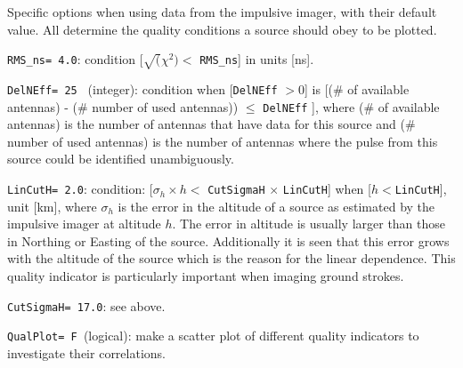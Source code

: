 Specific options when using data from the impulsive imager, with their default value. All determine the quality conditions a source should obey to be plotted. 
\begin{enumerate*}
\item \verb!RMS_ns= 4.0!: condition [$\sqrt(\chi^2) <$ \verb!RMS_ns!] in units [ns].
\item \verb!DelNEff= 25 ! (integer): condition when [\verb!DelNEff! $>0$] is [(\# of available antennas) - (\# number of used antennas)) $\leq$ \verb!DelNEff! ], where (\# of available antennas) is the number of antennas that have data for this source and (\# number of used antennas) is the number of antennas where the pulse from this source could be identified unambiguously.
\item \verb!LinCutH= 2.0!: condition: [$\sigma_h \times h <$ \verb!CutSigmaH! $\times$ \verb!LinCutH!] when [$h < $\verb!LinCutH!], unit [km], where $\sigma_h$ is the error in the altitude of a source as estimated by the impulsive imager at altitude $h$. The error in altitude is usually larger than those in Northing or Easting of the source. Additionally it is seen that this error grows with the altitude of the source which is the reason for the linear dependence. This quality indicator is particularly important when imaging ground strokes.
\item \verb!CutSigmaH= 17.0!: see above.
\item \verb!QualPlot= F !(logical): make a scatter plot of different quality indicators to investigate their correlations.
\end{enumerate*}

